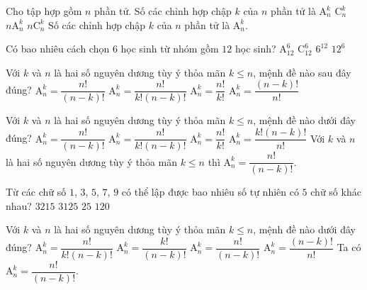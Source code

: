 \begin{ex}%
 Cho tập hợp gồm $n$ phần tử. Số các chỉnh hợp chập $k$ của $n$ phần tử là
 \choice
  {\True $\mathrm{A}_n^k$}
  {$\mathrm{C}_n^k$}
  {$n\mathrm{A}_n^k$}
  {$n\mathrm{C}_n^k$}
 \loigiai
  {
  Số các chỉnh hợp chập $k$ của $n$ phần tử là $\mathrm{A}_n^k$.
  }
\end{ex}%
\begin{ex}%
	Có bao nhiêu cách chọn $6$ học sinh từ nhóm gồm $12$ học sinh? 
	\choice
	{$\mathrm{A}^6_{12}$}
	{\True $\mathrm{C}^6_{12}$}
	{$6^{12}$}
	{$12^6$}
\end{ex}%
\begin{ex}%
	Với $k$ và $n$ là hai số nguyên dương tùy ý thỏa mãn $k\le n$, mệnh đề nào sau đây đúng?
	\choice	
	{\True $\mathrm{A}_n^k=\dfrac{n!}{(n-k)!}$}
	{$\mathrm{A}_n^k=\dfrac{n!}{k!(n-k)!}$}
	{$\mathrm{A}_n^k=\dfrac{n!}{k!}$}
	{$\mathrm{A}_n^k=\dfrac{(n-k)!}{n!}$}
\end{ex}%
\begin{ex}%
 Với $k$ và $n$ là hai số nguyên dương tùy ý thỏa mãn $k\leq n$, mệnh đề nào dưới đây đúng?
 \choice
  {\True $\mathrm{A}_n^k=\dfrac{n!}{(n-k)!}$}
  {$\mathrm{A}_n^k=\dfrac{n!}{k!(n-k)!}$}
  {$\mathrm{A}_n^k=\dfrac{n!}{k!}$}
  {$\mathrm{A}_n^k=\dfrac{k!(n-k)!}{n!}$}
 \loigiai
  {
  Với $k$ và $n$ là hai số nguyên dương tùy ý thỏa mãn $k\leq n$ thì $\mathrm{A}_n^k=\dfrac{n!}{(n-k)!}$.
  }
\end{ex}%
\begin{ex}%
	Từ các chữ số $1$, $3$, $5$, $7$, $9$ có thể lập được bao nhiêu số tự nhiên có $5$ chữ số khác nhau?
	\choice
	{$3215$}
	{$3125$}
	{$25$}
	{\True $120$}
\end{ex}%
\begin{ex}%
	Với $k$ và $n$ là hai số nguyên dương tùy ý thỏa mãn $k\le n$, mệnh đề nào dưới đây đúng?
	\choice
	{$\mathrm{A}_{n}^{k}=\dfrac{n !}{k !(n-k) !}$}
	{$\mathrm{A}_{n}^{k}=\dfrac{k !}{(n-k) !}$}
	{\True $\mathrm{A}_{n}^{k}=\dfrac{n !}{(n-k) !}$}
	{$\mathrm{A}_{n}^{k}=\dfrac{(n-k) !}{n !}$}
	\loigiai
	{
		Ta có $\mathrm{A}_{n}^{k}=\dfrac{n !}{(n-k) !}$.
	}
\end{ex}%
